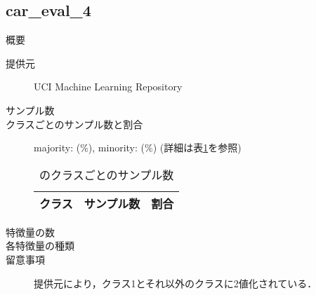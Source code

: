 \subsection{car\_eval\_4}
\begin{description}
    \item[概要] \cite{}
    \item[提供元] UCI Machine Learning Repository
    \item[サンプル数] 
    \item[クラスごとのサンプル数と割合] majority:  (\%), minority:  (\%) (詳細は表\ref{tab:}を参照)

        \begin{table}[htbp]
            \centering
            \caption{のクラスごとのサンプル数}
            \label{tab:}
            \begin{tabular}{lrc} \hline
                \multicolumn{1}{c}{クラス}&
                \multicolumn{1}{c}{サンプル数}&
                \multicolumn{1}{c}{割合}\\
                \hline
                \hline

                \hline
            \end{tabular}
        \end{table}

    \item[特徴量の数] 
    \item[各特徴量の種類] \mbox{}
        
    \item[留意事項] 提供元により，クラス1とそれ以外のクラスに2値化されている．
\end{description}

